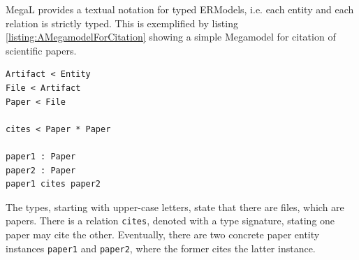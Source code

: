 \Gls{MegaL} provides a textual notation for typed \glspl{ERModel}, i.e. each entity and each relation is strictly typed.
This is exemplified by listing \ref{listing:AMegamodelForCitation} showing a simple \gls{Megamodel} for citation of scientific papers.
\begin{lstlisting}[caption={A Megamodel for Citation},label={listing:AMegamodelForCitation}]
Artifact < Entity
File < Artifact
Paper < File

cites < Paper * Paper

paper1 : Paper
paper2 : Paper
paper1 cites paper2
\end{lstlisting}
The types, starting with upper-case letters, state that there are files, which are papers.
There is a relation \texttt{cites}, denoted with a type signature, stating one paper may cite the other.
Eventually, there are two concrete paper entity instances \texttt{paper1} and \texttt{paper2}, where the former cites the latter instance.

